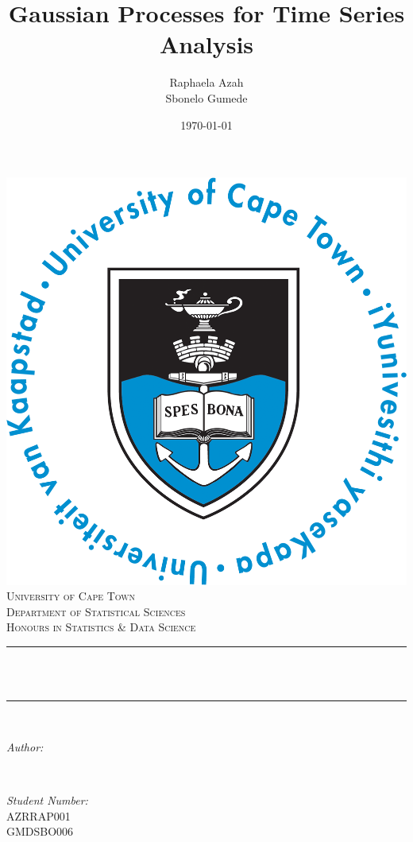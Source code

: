 \documentclass{article}
\title{Gaussian Processes for Time Series Analysis}
\author{Raphaela Azah\\
        Sbonelo Gumede}
\date{\today}
\makeatletter
\let\thetitle\@title
\let\theauthor\@author
\let\thedate\@date
\makeatother
\begin{document}
   \begin{titlepage}
      \centering
      \includegraphics[scale = 0.38]{../images/UCT_logo.png}\\[0.8 cm]
      \textsc{\LARGE University of Cape Town}\\[1.5 cm]
      \textsc{\Large Department of Statistical Sciences}\\[0.5 cm]	
      \textsc{\large Honours in Statistics \& Data Science}\\[1 cm]
      \rule{\linewidth}{0.2 mm} \\[0.3 cm]
      \LARGE \textbf{\thetitle}\\
      \rule{\linewidth}{0.2 mm} \\[1 cm]
      
      \begin{minipage}{0.4\textwidth}
         \begin{flushleft} \large
            \emph{Author:}\\
            \theauthor
         \end{flushleft}
      \end{minipage}~
      \begin{minipage}{0.4\textwidth}
         \begin{flushright} \large
            \emph{Student Number:} \\
            AZRRAP001\\ 
            GMDSBO006
         \end{flushright}
      \end{minipage}\\[3 cm]
      \large
      \thedate\\
      \vfill
   \end{titlepage}
\end{document}
